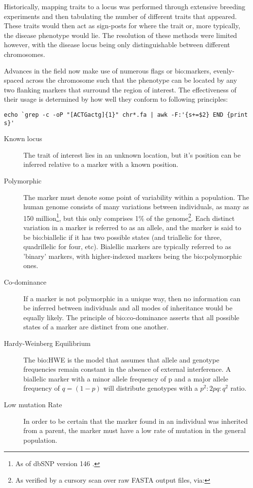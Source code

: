 Historically, mapping traits to a locus was performed through extensive breeding experiments and then tabulating the number of different traits that appeared. These traits would then act as sign-posts for where the trait or, more typically, the disease phenotype would lie. The resolution of these methods were limited however, with the disease locus being only distinguishable between different chromosomes.

Advances in the field now make use of numerous flags or \gls{bio:markers}, evenly-spaced across the chromosome such that the phenotype can be located by any two flanking markers that surround the region of interest. The effectiveness of their usage  is determined by how well they conform to following principles:

\begin{lrbox}\myVerb\scriptsize
    \verb!echo `grep -c -oP "[ACTGactg]{1}" chr*.fa | awk -F:'{s+=$2} END {print s}'!
\end{lrbox}%

\begin{description}
\item[Known locus]{
	The trait of interest lies in an unknown location, but it's position can be inferred relative to a marker with a known position.
}
\item[Polymorphic]
{
	The marker must denote some point of variability within a population. The human genome consists of many variations between individuals, as many as 150 million\footnote{As of dbSNP version 146 \cite{sherry2001dbsnp}.}, but this only comprises 1\% of the genome\footnote{As verified by a cursory scan over raw FASTA output files, via: \usebox\myVerb}. Each distinct variation in a marker is referred to as an allele, and the marker is said to be \gls{bio:biallelic} if it has two possible states (and triallelic for three, quadrillelic for four, etc). Bialellic markers are typically referred to as 'binary' markers, with higher-indexed markers being the \gls{bio:polymorphic} ones.
}
\item[Co-dominance]{If a marker is not polymorphic in a unique way, then no information can be inferred between individuals and all modes of inheritance would be equally likely. The principle of \gls{bio:co-dominance} asserts that all possible states of a marker are distinct from one another.}
\item[Hardy-Weinberg Equilibrium]{The \gls{bio:HWE} is the model that assumes that allele and genotype frequencies remain constant in the absence of external interference. A biallelic marker with a minor allele frequency of p and a major allele frequency of \(q = (1-p)\) will distribute genotypes with a \(p^2 : 2pq : q^2\) ratio.}
\item[Low mutation Rate]{In order to be  certain that the marker found in an individual was inherited from a parent, the marker must have a low rate of mutation in the general population.}
\end{description}

